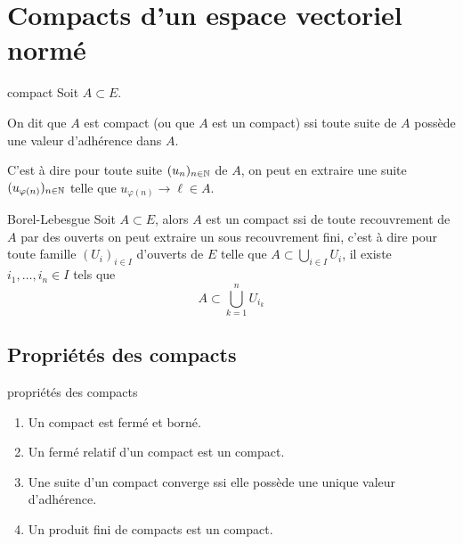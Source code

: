 \section{Compacts d'un espace vectoriel normé }

\begin{definition}{compact}{}
    Soit $A \subset E$. 

    On dit que $A$ est compact (ou que $A$ est un compact) ssi toute suite de $A$ possède une 
    valeur d'adhérence dans $A$. 

    C'est à dire pour toute suite $(u_n)_{n \in \mathbb{N}}$ de $A$, on peut en extraire une suite 
    $(u_{\varphi(n)})_{n \in \mathbb{N}}$ telle que $u_{\varphi(n)} \to \ell \in A$.
\end{definition}


\begin{definition}{Borel-Lebesgue}{}
    Soit $A \subset E$, alors
    $A$ est un compact ssi de toute recouvrement de $A$ par des ouverts on peut extraire un sous 
    recouvrement fini, c'est à dire pour toute famille $(U_i)_{i \in I}$ d'ouverts de $E$ 
    telle que $\displaystyle A \subset \bigcup_{i \in I} U_i$, il existe $i_1, \ldots, i_n \in I$ tels que
    $$\displaystyle A \subset \bigcup_{k=1}^n U_{i_k}$$
\end{definition}

\subsection{Propriétés des compacts }

\begin{proposition}{propriétés des compacts }{}
    \begin{enumerate}
        \item Un compact est fermé et borné.
        \item Un fermé relatif d'un compact est un compact.
        \item Une suite d'un compact converge ssi elle possède une unique valeur d'adhérence. 
        \item Un produit fini de compacts est un compact.
    \end{enumerate}
\end{proposition}


